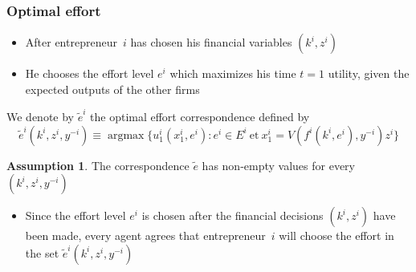 \documentclass[blue]{beamer}
\def\R{\mathbb{R}}
\DeclareMathOperator\argmax{argmax}
\theoremstyle{definition}
\newtheorem*{assumption}{Assumption}
\theoremstyle{example}
\begin{document}
\begin{frame}\frametitle{Optimal effort}

\begin{itemize}
\item After entrepreneur~$i$ has chosen his financial variables $(k^i,z^i)$
\item He chooses the effort level $e^i$ which maximizes his time $t=1$ utility, given the expected outputs of the other firms
\end{itemize}

We denote by $\widetilde{e}^i$ the \alert{optimal effort correspondence} defined by
\[
\widetilde{e}^i(k^i,z^i,y^{-i}) \equiv \argmax \{ u^i_1(x^i_1,e^i) \colon e^i \in E^i \ \textrm{et} \ x^i_1 = V(f^i(k^i,e^i),y^{-i}) z^i \}
\]

\begin{assumption}
The correspondence $\widetilde{e}$ has non-empty values for every $(k^i,z^i,y^{-i})$
\end{assumption}

\begin{itemize}
\item Since the effort level $e^i$ is chosen after the financial decisions $(k^i,z^i)$ have been made, every agent agrees that entrepreneur~$i$ will choose the effort in the set
$\widetilde{e}^i(k^i,z^i,y^{-i})$
\end{itemize}

\end{frame}



%
%
\end{document}
